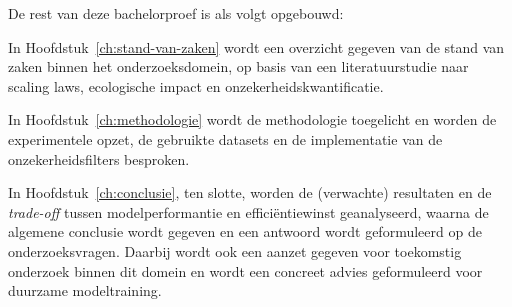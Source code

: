 De rest van deze bachelorproef is als volgt opgebouwd:

In Hoofdstuk~\ref{ch:stand-van-zaken} wordt een overzicht gegeven van de stand van zaken binnen het onderzoeksdomein, op basis van een literatuurstudie naar scaling laws, ecologische impact en onzekerheidskwantificatie.

In Hoofdstuk~\ref{ch:methodologie} wordt de methodologie toegelicht en worden de experimentele opzet, de gebruikte datasets en de implementatie van de onzekerheidsfilters besproken.

In Hoofdstuk~\ref{ch:conclusie}, ten slotte, worden de (verwachte) resultaten en de \textit{trade-off} tussen modelperformantie en efficiëntiewinst geanalyseerd, waarna de algemene conclusie wordt gegeven en een antwoord wordt geformuleerd op de onderzoeksvragen. Daarbij wordt ook een aanzet gegeven voor toekomstig onderzoek binnen dit domein en wordt een concreet advies geformuleerd voor duurzame modeltraining.
